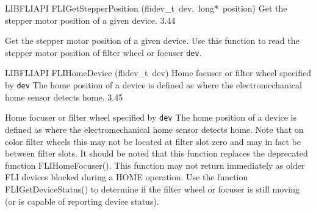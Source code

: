 \documentclass{article}
\begin{document}
\begin{cxxentry}
\begin{cxxfunction}
\begin{cxxdoc}
\end{cxxdoc}
\end{cxxfunction}
\begin{cxxfunction}
{LIBFLIAPI}
        {FLIGetStepperPosition}
        {(flidev\_t\ dev,\ long*\ position)}
        { Get the stepper motor position of a given device.}
        {3.44}
\begin{cxxdoc}

Get the stepper motor position of a given device.  Use this
function to read the stepper motor position of filter wheel or
focuser \texttt{dev}.


\end{cxxdoc}
\end{cxxfunction}
\begin{cxxfunction}
{LIBFLIAPI}
        {FLIHomeDevice}
        {(flidev\_t\ dev)}
        { Home focuser or filter wheel specified by \texttt{dev} The home position of a device is defined as where the electromechanical home sensor detects home.}
        {3.45}
\begin{cxxdoc}

Home focuser or filter wheel specified by \texttt{dev}
The home position of a device is defined as where the electromechanical
home sensor detects home. Note that on color filter wheels this may not
be located at filter slot zero and may in fact be between filter slots.
It should be noted that this function replaces the deprecated function
FLIHomeFocuser(). This function may not return immediately as older FLI devices
blocked during a HOME operation. Use the function FLIGetDeviceStatus() to
determine if the filter wheel or focuser is still moving (or is capable of reporting
device status).



\end{cxxdoc}
\end{cxxfunction}
\end{cxxentry}
\end{document}
